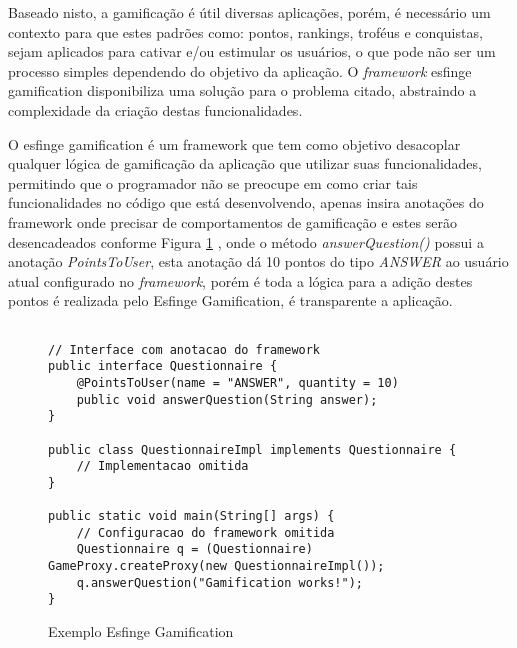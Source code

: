 \par Baseado nisto, a gamificação é útil diversas aplicações, porém, é necessário um contexto para que estes padrões como: pontos, rankings, troféus e conquistas, sejam aplicados para cativar e/ou estimular os usuários, o que pode não ser um processo simples dependendo do objetivo da aplicação. O \textit{framework} esfinge gamification disponibiliza uma solução para o problema citado, abstraindo a complexidade da criação destas funcionalidades.
\par O esfinge gamification é um framework que tem como objetivo desacoplar qualquer lógica de gamificação da aplicação que utilizar suas funcionalidades, permitindo que o programador não se preocupe em como criar tais funcionalidades no código que está desenvolvendo, apenas insira anotações do framework onde precisar de comportamentos de gamificação e estes serão desencadeados conforme Figura \ref{fig:esfingesample} , onde o método \textit{answerQuestion()} possui a anotação \textit{PointsToUser}, esta anotação dá 10 pontos do tipo \textit{ANSWER} ao usuário atual configurado no \textit{framework}, porém é toda a lógica para a adição destes pontos é realizada pelo Esfinge Gamification, é transparente a aplicação.

\begin{figure}[H]
    \centering
    \begin{lstlisting}

// Interface com anotacao do framework
public interface Questionnaire {
	@PointsToUser(name = "ANSWER", quantity = 10)
	public void answerQuestion(String answer);
}

public class QuestionnaireImpl implements Questionnaire {
	// Implementacao omitida
}

public static void main(String[] args) {
	// Configuracao do framework omitida
	Questionnaire q = (Questionnaire) GameProxy.createProxy(new QuestionnaireImpl());
	q.answerQuestion("Gamification works!");
}
\end{lstlisting}
    \caption{Exemplo Esfinge Gamification}
    \label{fig:esfingesample}
\end{figure}

